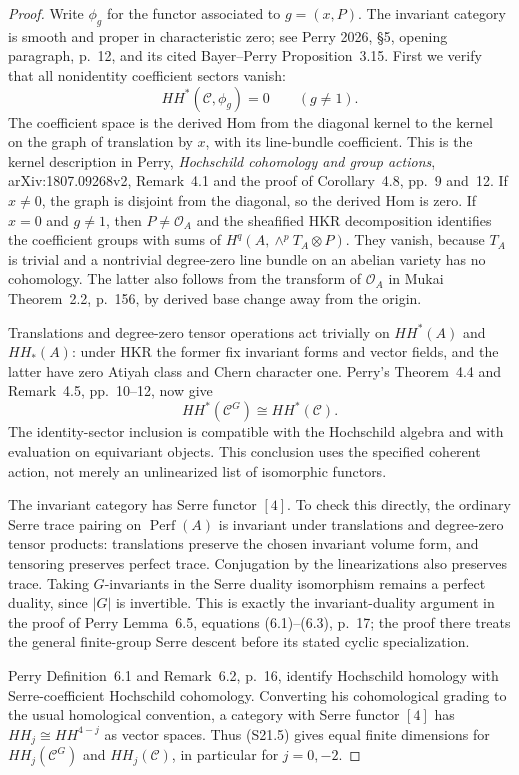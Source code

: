 \begin{proof}
Write $\phi_g$ for the functor associated to $g=(x,P)$.
The invariant category is smooth and proper in characteristic
zero; see Perry 2026, \S5, opening paragraph, p.~12,
and its cited Bayer--Perry Proposition~3.15.
First we verify that all nonidentity coefficient sectors vanish:
\[
 HH^*(\mathcal C,\phi_g)=0\qquad(g\ne1).
 \tag{S21.4}
\]
The coefficient space is the derived Hom from the diagonal
kernel to the kernel on the graph of translation by $x$,
with its line-bundle coefficient. This is the kernel
description in Perry, \emph{Hochschild cohomology and group
actions}, arXiv:1807.09268v2, Remark~4.1 and the proof of
Corollary~4.8, pp.~9 and~12. If $x\ne0$, the graph is
disjoint from the diagonal, so the derived Hom is zero.
If $x=0$ and $g\ne1$, then $P\ne\mathcal O_A$ and
the sheafified HKR decomposition identifies the coefficient
groups with sums of
$H^q(A,\wedge^pT_A\otimes P)$.
They vanish, because $T_A$ is trivial and a nontrivial
degree-zero line bundle on an abelian variety has no
cohomology. The latter also follows from the transform of
$\mathcal O_A$ in Mukai Theorem~2.2, p.~156, by derived
base change away from the origin.

Translations and degree-zero tensor operations act trivially
on $HH^*(A)$ and $HH_*(A)$: under HKR the former fix invariant
forms and vector fields, and the latter have zero Atiyah
class and Chern character one. Perry's Theorem~4.4 and
Remark~4.5, pp.~10--12, now give
\[
 HH^*(\mathcal C^G)\cong HH^*(\mathcal C).
 \tag{S21.5}
\]
The identity-sector inclusion is compatible with the
Hochschild algebra and with evaluation on equivariant objects.
This conclusion uses the specified coherent action, not
merely an unlinearized list of isomorphic functors.

The invariant category has Serre functor $[4]$.
To check this directly, the ordinary Serre trace pairing on
$\operatorname{Perf}(A)$ is invariant under translations
and degree-zero tensor products: translations preserve the
chosen invariant volume form, and tensoring preserves
perfect trace. Conjugation by the linearizations also
preserves trace. Taking $G$-invariants in the Serre duality
isomorphism remains a perfect duality, since $|G|$ is
invertible. This is exactly the invariant-duality argument
in the proof of Perry Lemma~6.5, equations (6.1)--(6.3),
p.~17; the proof there treats the general finite-group
Serre descent before its stated cyclic specialization.

Perry Definition~6.1 and Remark~6.2, p.~16, identify
Hochschild homology with Serre-coefficient Hochschild
cohomology. Converting his cohomological grading to the
usual homological convention, a category with Serre functor
$[4]$ has $HH_j\cong HH^{4-j}$ as vector spaces.
Thus (S21.5) gives equal finite dimensions for
$HH_j(\mathcal C^G)$ and $HH_j(\mathcal C)$, in particular
for $j=0,-2$.


\end{proof}
